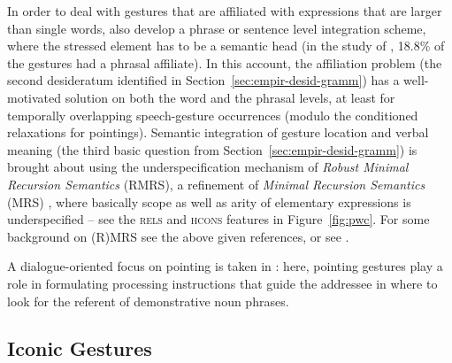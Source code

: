 \documentclass[output=paper
                ,modfonts
                ,nonflat
	        ,collection
	        ,collectionchapter
	        ,collectiontoclongg
 	        ,biblatex
                ,babelshorthands
                ,newtxmath
                ,draftmode
                ,colorlinks, citecolor=brown
]{./langsci/langscibook}
\begin{document}
In order to deal with gestures that are affiliated with expressions that are larger than single words, \citet{Alahverdzhieva:Lascarides:Flickinger:2017} also develop a phrase or sentence level integration scheme, where the stressed element has to be a semantic head (in the study of \citealt{Mehler:Luecking:2012:d}, 18.8\% of the gestures had a phrasal affiliate).
%
In this account, the affiliation problem (the second desideratum identified in Section~\ref{sec:empir-desid-gramm}) has a well-motivated solution on both the word and the phrasal levels, at least for temporally overlapping speech-gesture occurrences (modulo the conditioned relaxations for pointings).
%
Semantic integration of gesture location and verbal meaning (the third basic question from Section~\ref{sec:empir-desid-gramm}) is brought about using the underspecification mechanism of \emph{Robust Minimal Recursion Semantics}  (RMRS), a refinement of \emph{Minimal Recursion Semantics}  (MRS) \citep{Copestake:Flickinger:Pollard:Sag:2005}, where basically scope as well as arity of elementary expressions is underspecified \citep{Copestake:2007} -- see the \textsc{rels} and \textsc{hcons} features in Figure~\ref{fig:pwc}.
%
For some background on (R)MRS see the above given references, or see . %


A dialogue-oriented focus on pointing is taken in \citet{Luecking:2018:a}: here, pointing gestures play a role in formulating processing instructions that guide the addressee in where to look for the referent of demonstrative noun phrases. %
 



\subsection{Iconic Gestures}
\label{sec:iconic-gestures}
\end{document}
